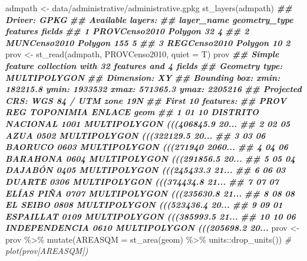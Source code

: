 \documentclass[10pt,landscape,a3paper]{article}
\newenvironment{Shaded}{\begin{snugshade}}{\end{snugshade}}
\newcommand{\AttributeTok}[1]{\textcolor[rgb]{0.77,0.63,0.00}{#1}}
\newcommand{\CommentTok}[1]{\textcolor[rgb]{0.56,0.35,0.01}{\textit{#1}}}
\newcommand{\DocumentationTok}[1]{\textcolor[rgb]{0.56,0.35,0.01}{\textbf{\textit{#1}}}}
\newcommand{\FunctionTok}[1]{\textcolor[rgb]{0.00,0.00,0.00}{#1}}
\newcommand{\NormalTok}[1]{#1}
\newcommand{\OtherTok}[1]{\textcolor[rgb]{0.56,0.35,0.01}{#1}}
\newcommand{\SpecialCharTok}[1]{\textcolor[rgb]{0.00,0.00,0.00}{#1}}
\newcommand{\StringTok}[1]{\textcolor[rgb]{0.31,0.60,0.02}{#1}}
\begin{document}
\begin{Shaded}
\begin{Highlighting}[]
\NormalTok{admpath }\OtherTok{\textless{}{-}} \StringTok{\textquotesingle{}data/administrative/administrative.gpkg\textquotesingle{}}
\FunctionTok{st\_layers}\NormalTok{(admpath)}
\DocumentationTok{\#\# Driver: GPKG }
\DocumentationTok{\#\# Available layers:}
\DocumentationTok{\#\#      layer\_name geometry\_type features fields}
\DocumentationTok{\#\# 1 PROVCenso2010       Polygon       32      4}
\DocumentationTok{\#\# 2  MUNCenso2010       Polygon      155      5}
\DocumentationTok{\#\# 3  REGCenso2010       Polygon       10      2}
\NormalTok{prov }\OtherTok{\textless{}{-}} \FunctionTok{st\_read}\NormalTok{(admpath, }\StringTok{\textquotesingle{}PROVCenso2010\textquotesingle{}}\NormalTok{, }\AttributeTok{quiet =}\NormalTok{ T)}
\NormalTok{prov}
\DocumentationTok{\#\# Simple feature collection with 32 features and 4 fields}
\DocumentationTok{\#\# Geometry type: MULTIPOLYGON}
\DocumentationTok{\#\# Dimension:     XY}
\DocumentationTok{\#\# Bounding box:  xmin: 182215.8 ymin: 1933532 xmax: 571365.3 ymax: 2205216}
\DocumentationTok{\#\# Projected CRS: WGS 84 / UTM zone 19N}
\DocumentationTok{\#\# First 10 features:}
\DocumentationTok{\#\#    PROV REG         TOPONIMIA ENLACE                           geom}
\DocumentationTok{\#\# 1    01  10 DISTRITO NACIONAL   1001 MULTIPOLYGON (((406845.9 20...}
\DocumentationTok{\#\# 2    02  05              AZUA   0502 MULTIPOLYGON (((322129.5 20...}
\DocumentationTok{\#\# 3    03  06           BAORUCO   0603 MULTIPOLYGON (((271940 2060...}
\DocumentationTok{\#\# 4    04  06          BARAHONA   0604 MULTIPOLYGON (((291856.5 20...}
\DocumentationTok{\#\# 5    05  04           DAJABÓN   0405 MULTIPOLYGON (((245433.3 21...}
\DocumentationTok{\#\# 6    06  03            DUARTE   0306 MULTIPOLYGON (((374434.8 21...}
\DocumentationTok{\#\# 7    07  07        ELÍAS PIÑA   0707 MULTIPOLYGON (((235630.8 21...}
\DocumentationTok{\#\# 8    08  08          EL SEIBO   0808 MULTIPOLYGON (((523436.4 20...}
\DocumentationTok{\#\# 9    09  01         ESPAILLAT   0109 MULTIPOLYGON (((385993.5 21...}
\DocumentationTok{\#\# 10   10  06     INDEPENDENCIA   0610 MULTIPOLYGON (((205698.2 20...}
\NormalTok{prov }\OtherTok{\textless{}{-}}\NormalTok{ prov }\SpecialCharTok{\%\textgreater{}\%} \FunctionTok{mutate}\NormalTok{(}\AttributeTok{AREASQM =} \FunctionTok{st\_area}\NormalTok{(geom) }\SpecialCharTok{\%\textgreater{}\%}\NormalTok{ units}\SpecialCharTok{::}\FunctionTok{drop\_units}\NormalTok{())}
\CommentTok{\# plot(prov[\textquotesingle{}AREASQM\textquotesingle{}])}

\end{Highlighting}
\end{Shaded}
\end{document}
